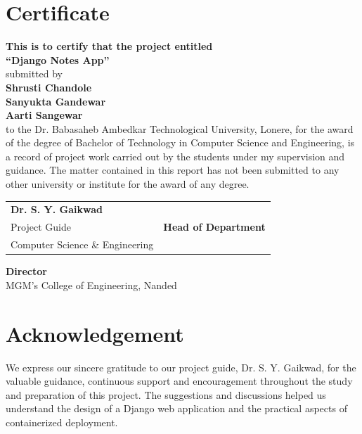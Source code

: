 \documentclass[12pt,a4paper,oneside]{report}
\begin{document}
\chapter*{Certificate}
\begin{center}
\textbf{This is to certify that the project entitled}\\[0.2in]
\textbf{\large ``Django Notes App''}\\[0.2in]
submitted by\\[0.1in]
\textbf{Shrusti Chandole}\\
\textbf{Sanyukta Gandewar}\\
\textbf{Aarti Sangewar}\\[0.2in]
to the Dr. Babasaheb Ambedkar Technological University, Lonere, for the award of the degree of Bachelor of Technology in Computer Science and Engineering, is a record of project work carried out by the students under my supervision and guidance. The matter contained in this report has not been submitted to any other university or institute for the award of any degree.\\[0.45in]
\end{center}

\vspace{0.5in}
\noindent
\begin{tabularx}{\textwidth}{X X}
\centering\textbf{Dr. S. Y. Gaikwad}\\
\centering Project Guide
&
\centering\textbf{Head of Department}\\
\centering Computer Science \& Engineering
\end{tabularx}

\vspace{0.8in}
\begin{center}
\textbf{Director}\\
MGM's College of Engineering, Nanded
\end{center}

\clearpage
\chapter*{Acknowledgement}
We express our sincere gratitude to our project guide, Dr. S. Y. Gaikwad, for the valuable guidance, continuous support and encouragement throughout the study and preparation of this project. The suggestions and discussions helped us understand the design of a Django web application and the practical aspects of containerized deployment.
\end{document}
